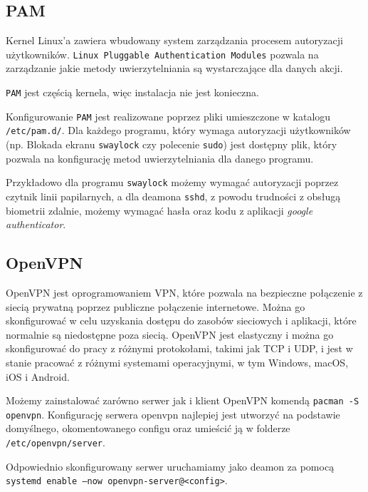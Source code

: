 \documentclass[12pt,a4paper]{article}
\begin{document}
\subsection{PAM}

Kernel Linux'a zawiera wbudowany system zarządzania procesem autoryzacji
użytkowników. \texttt{Linux Pluggable Authentication Modules} pozwala na
zarządzanie jakie metody uwierzytelniania są wystarczające dla danych akcji.

\texttt{PAM} jest częścią kernela, więc instalacja nie jest konieczna.

Konfigurowanie \texttt{PAM} jest realizowane poprzez pliki umieszczone w
katalogu \texttt{/etc/pam.d/}. Dla każdego programu, który wymaga autoryzacji
użytkowników (np. Blokada ekranu \texttt{swaylock} czy polecenie \texttt{sudo})
jest dostępny plik, który pozwala na konfigurację metod uwierzytelniania dla
danego programu.

Przykładowo dla programu \texttt{swaylock} możemy wymagać autoryzacji poprzez
czytnik linii papilarnych, a dla deamona \texttt{sshd}, z powodu trudności z
obsługą biometrii zdalnie, możemy wymagać hasła oraz kodu z aplikacji
\emph{google authenticator}.

\subsection{OpenVPN}


OpenVPN jest oprogramowaniem VPN, które pozwala na bezpieczne połączenie z
siecią prywatną poprzez publiczne połączenie internetowe. Można go skonfigurować
w celu uzyskania dostępu do zasobów sieciowych i aplikacji, które normalnie są
niedostępne poza siecią. OpenVPN jest elastyczny i można go skonfigurować do
pracy z różnymi protokołami, takimi jak TCP i UDP, i jest w stanie pracować z
różnymi systemami operacyjnymi, w tym Windows, macOS, iOS i Android.

Możemy zainstalować zarówno serwer jak i klient OpenVPN komendą \texttt{pacman
-S openvpn}. Konfigurację serwera openvpn najlepiej jest utworzyć na podstawie
domyślnego, okomentowanego configu oraz umieścić ją w folderze
\texttt{/etc/openvpn/server}.

Odpowiednio skonfigurowany serwer uruchamiamy jako deamon za pomocą
\texttt{systemd enable --now openvpn-server@<config>}.
\end{document}
